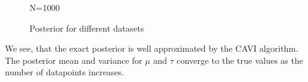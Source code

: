 \documentclass{article}
\begin{document}
\begin{multicols}{2}
\begin{figure}[H]
\begin{minipage}{0.49\textwidth}
            \caption{N=1000}
        \end{minipage}
        \caption{Posterior for different datasets}\label{fig:posterior}
    \end{figure}

    We see, that the exact posterior is well approximated by the CAVI algorithm. The posterior mean and variance for $\mu$ and $\tau$ converge to the true values as the number of datapoints increases.

    

\end{multicols}
\clearpage
{}
\end{document}
